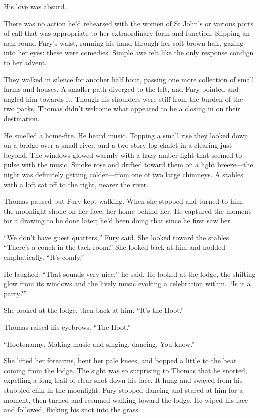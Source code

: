 \documentclass[11pt,a5paper]{article}
\begin{document}
His love was absurd.

There was no action he'd rehearsed with the women of St John's or various ports of call that was appropriate to her extraordinary form and function. Slipping an arm round Fury's waist, running his hand through her soft brown hair, gazing into her eyes: these were comedies. Simple awe felt like the only response condign to her advent.

They walked in silence for another half hour, passing one more collection of small farms and houses. A smaller path diverged to the left, and Fury pointed and angled him towards it. Though his shoulders were stiff from the burden of the two packs, Thomas didn't welcome what appeared to be a closing in on their destination.

He smelled a home-fire. He heard music. Topping a small rise they looked down on a bridge over a small river, and a two-story log chalet in a clearing just beyond. The windows glowed warmly with a hazy amber light that seemed to pulse with the music. Smoke rose and drifted toward them on a light breeze---the night was definitely getting colder---from one of two large chimneys. A stables with a loft sat off to the right, nearer the river.

Thomas paused but Fury kept walking. When she stopped and turned to him, the moonlight shone on her face, her home behind her. He captured the moment for a drawing to be done later; he'd been doing that since he first saw her.

``We don't have guest quarters,'' Fury said. She looked toward the stables. ``There's a couch in the tack room.'' She looked back at him and nodded emphatically. ``It's comfy.'' 

He laughed. ``That sounds very nice,'' he said. He looked at the lodge, the shifting glow from its windows and the lively music evoking a celebration within. ``Is it a party?''

She looked at the lodge, then back at him. ``It's the Hoot.''

Thomas raised his eyebrows. ``The Hoot.''

``Hootenanny. Making music and singing, dancing. You know.''

She lifted her forearms, bent her pale knees, and bopped a little to the beat coming from the lodge. The sight was so surprising to Thomas that he snorted, expelling a long trail of clear snot down his face. It hung and swayed from his stubbled chin in the moonlight. Fury stopped dancing and stared at him for a moment, then turned and resumed walking toward the lodge. He wiped his face and followed, flicking his snot into the grass.
\end{document}
